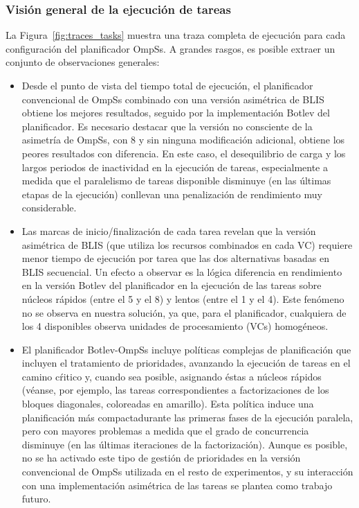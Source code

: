\subsubsection{Visión general de la ejecución de tareas}

La Figura~\ref{fig:traces_tasks} muestra una traza completa de ejecución para cada configuración del planificador OmpSs. A grandes rasgos, es posible
extraer un conjunto de observaciones generales:

\begin{itemize}
\item Desde el punto de vista del tiempo total de ejecución, el planificador convencional de OmpSs combinado con una versión asimétrica
	de BLIS obtiene los mejores resultados, seguido por la implementación Botlev del planificador. Es necesario destacar que
		la versión no consciente de la asimetría de OmpSs, con 8 \wt y sin ninguna modificación adicional, obtiene los peores
		resultados con diferencia. En este caso, el desequilibrio de carga y los largos periodos de inactividad en la
		ejecución de tareas, especialmente a medida que el paralelismo de tareas disponible disminuye (en las últimas etapas
		de la ejecución) conllevan una penalización de rendimiento muy considerable.

\item Las marcas de inicio/finalización de cada tarea revelan que la versión asimétrica de BLIS (que utiliza los recursos combinados
	en cada VC) requiere menor tiempo de ejecución por tarea que las dos alternativas basadas en BLIS secuencial. Un efecto a observar
		es la lógica diferencia en rendimiento en la versión Botlev del planificador en la ejecución de las tareas sobre núcleos
		rápidos (\wts entre el 5 y el 8) y lentos (\wts entre el 1 y el 4). Este fenómeno no se observa en nuestra solución, ya
		que, para el planificador, cualquiera de los 4 \wts disponibles observa unidades de procesamiento (VCs) homogéneos.

\item El planificador Botlev-OmpSs incluye políticas complejas de planificación que incluyen el tratamiento de prioridades,
	avanzando la ejecución de tareas en el camino cŕitico y, cuando sea posible, asignando éstas a núcleos rápidos (véanse,
		por ejemplo, las tareas correspondientes a factorizaciones de los bloques diagonales, coloreadas en amarillo). Esta
		política induce una planificación más compactadurante las primeras fases de la ejecución paralela, pero 
		con mayores problemas a medida que el grado de concurrencia disminuye (en las últimas iteraciones de la 
		factorización). Aunque es posible, no se ha activado este tipo de gestión de prioridades en la versión convencional
		de OmpSs utilizada en el resto de experimentos, y su interacción con una implementación asimétrica de las tareas
		se plantea como trabajo futuro.
\end{itemize}


